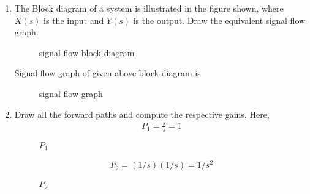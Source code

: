 \begin{enumerate}[label=\thesection.\arabic*.,ref=\thesection.\theenumi]

\item The Block diagram of a system is illustrated in the figure shown, where $X(s)$ is the input and $Y(s)$ is the output. Draw the equivalent signal flow graph.
\renewcommand{\thefigure}{\theenumi.\arabic{figure}}

\begin{figure}[!ht]
    \begin{center}
		
		\resizebox{\columnwidth}{!}{}
	\end{center}
\caption{signal flow block diagram}
\label{fig:sec_order}
\end{figure}
\solution
Signal flow graph of given above block diagram is
\begin{figure}[!ht]
\begin{center}
		
		\resizebox{\columnwidth}{!}{}
	\end{center}
\caption{signal flow graph}
\label{fig:sec_order}
\end{figure}
%
\renewcommand{\thefigure}{\theenumi}
\item Draw all the forward paths and compute the respective gains.
\renewcommand{\thefigure}{\theenumi.\arabic{figure}}
\solution
Here, 
\begin{align}
P_1=\frac{s}{s}=1
\end{align}

\begin{figure}[!ht]
\begin{center}
		
		\resizebox{\columnwidth}{!}{}
	\end{center}
\caption{$P_1$}
\label{fig:sec_order}
\end{figure}

 
\begin{align}
P_2=(1/s)(1/s)=1/s^2
\end{align}

\begin{figure}[!ht]
\begin{center}
		
		\resizebox{\columnwidth}{!}{}
	\end{center}
\caption{$P_2$}
\label{fig:sec_order}
\end{figure}
\renewcommand{\thefigure}{\theenumi}


\end{enumerate}
